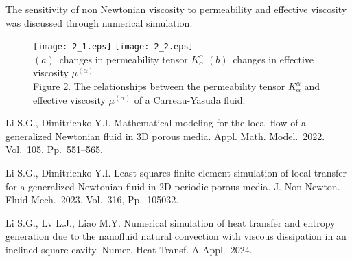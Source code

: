 \documentclass[12pt]{llncs}
\begin{document}
The sensitivity of non Newtonian viscosity to permeability and effective viscosity was discussed through numerical simulation.
\begin{figure}[htp]
\centering
\texttt{[image: 2\_1.eps]}
\texttt{[image: 2\_2.eps]}\\
$(a)$\ changes in permeability tensor $K_{\alpha}^{\alpha}$\quad\quad\quad
$(b)$\ changes in effective viscosity $\mu^{(\alpha)}$\\
\small{Figure 2. The relationships between the permeability tensor $K_{\alpha}^{\alpha}$
and effective viscosity $\mu^{(\alpha)}$  of a Carreau-Yasuda fluid.}
\end{figure}


\begin{thebibliography}{9} %
 Li S.G., Dimitrienko Y.I.
    Mathematical modeling for the local flow of a generalized Newtonian fluid in 3D porous media.
    Appl. Math. Model.~2022. Vol.~105, Pp.~551--565. %

 Li S.G., Dimitrienko Y.I.
    Least squares finite element simulation of local transfer for a generalized Newtonian fluid in 2D periodic porous media.
    J. Non-Newton. Fluid Mech.~2023. Vol.~316, Pp.~105032. %

 Li S.G., Lv L.J., Liao M.Y. Numerical simulation of heat transfer and entropy generation due to the nanofluid natural convection with viscous dissipation in an inclined square cavity. Numer. Heat Transf. A Appl.~2024. %
\end{thebibliography}
\end{document}
